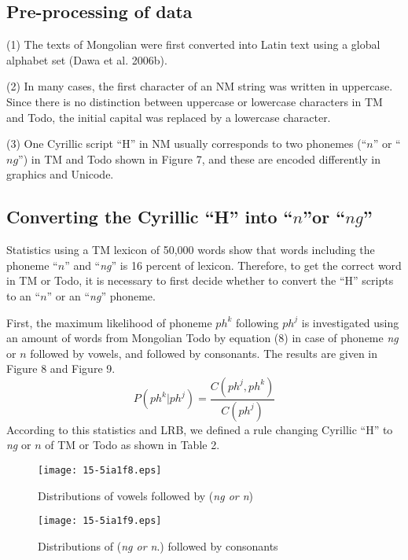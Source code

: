 \documentclass[english]{jnlp_1.4}
\begin{document}
\subsection{Pre-processing of data}

(1) The texts of Mongolian were first converted into Latin text using a 
global alphabet set (Dawa et al. 2006b).

(2) In many cases, the first character of an NM string was written in 
uppercase. Since there is no distinction between uppercase or lowercase 
characters in TM and Todo, the initial capital was replaced by a lowercase 
character.

(3) One Cyrillic script ``H'' in NM usually corresponds to two phonemes 
(``$n$'' or ``$ng$'') in TM and Todo shown in Figure 7, and these are encoded 
differently in graphics and Unicode.


\subsection{Converting the Cyrillic ``H'' into ``$n$''or ``$ng$''}

Statistics using a TM lexicon of 50,000 words show that words including the 
phoneme ``$n$'' and ``\textit{ng}'' is 16 percent of lexicon. Therefore, to get the 
correct word in TM or Todo, it is necessary to first decide whether to 
convert the ``H'' scripts to an ``$n$'' or an ``\textit{ng}'' phoneme.

First, the maximum likelihood of phoneme $ph^{k}$ following $ph^{j}$ is investigated using an amount of words from Mongolian Todo by equation (8) 
in case of phoneme \textit{ng} or $n$ followed by vowels, and followed by consonants. The 
results are given in Figure 8 and Figure 9.
\begin{equation}
 P(ph^{k}|ph^{j})=\frac{C(ph^{j},ph^{k})}{C(ph^{j})}
\end{equation}
According to this statistics and LRB, we defined a rule changing Cyrillic 
``H'' to \textit{ng} or $n$ of TM or Todo as shown in Table 2.

\begin{figure}[b]
\centerline{\texttt{[image: 15-5ia1f8.eps]}}
\caption{Distributions of vowels followed by (\textit{ng or n})}
\label{fig21}
\end{figure}
\begin{figure}[b]
\centerline{\texttt{[image: 15-5ia1f9.eps]}}
\caption{Distributions of (\textit{ng or n}.) followed by consonants}
\label{fig22}
\end{figure}
\end{document}
